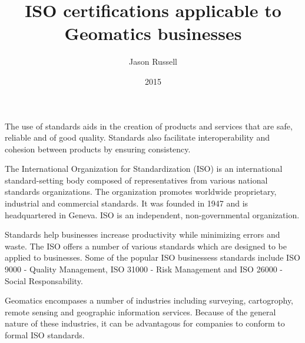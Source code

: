 \documentclass[11pt,a4paper]{article}
\title{ISO certifications applicable to Geomatics businesses}
\date{2015}
\author{Jason Russell}
\begin{document}
\maketitle

\newpage

The use of standards aids in the creation of products and services that are safe, reliable and of good quality.  Standards also facilitate interoperability and cohesion between products by ensuring consistency.

\vspace{5mm}

The International Organization for Standardization (ISO) is an international standard-setting body composed of representatives from various national standards organizations. The organization promotes worldwide proprietary, industrial and commercial standards. It was founded in 1947 and is headquartered in Geneva. ISO is an independent, non-governmental organization.

\vspace{5mm}

Standards help businesses increase productivity while minimizing errors and waste. The ISO offers a number of various standards which are designed to be applied to businesses. Some of the popular ISO businessess standards include ISO 9000 - Quality Management, ISO 31000 - Risk Management and ISO 26000 - Social Responsability.

\vspace{5mm}

Geomatics encompases a number of industries including surveying, cartogrophy, remote sensing and geographic information services. Because of the general nature of these industries, it can be advantagous for companies to conform to formal ISO standards.


\newpage
\printbibliography
\end{document}
